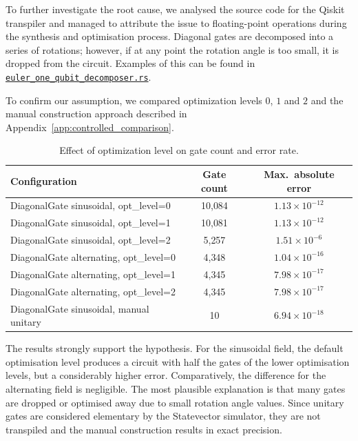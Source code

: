 To further investigate the root cause, we analysed the source code for the Qiskit transpiler and managed to attribute the issue to floating-point operations during the synthesis and optimisation process.
Diagonal gates are decomposed into a series of rotations; however, if at any point the rotation angle is too small, it is dropped from the circuit.
Examples of this can be found in \href{https://github.com/Qiskit/qiskit/blob/main/crates/synthesis/src/euler_one_qubit_decomposer.rs}{\texttt{euler\_one\_qubit\_decomposer.rs}}.

To confirm our assumption, we compared optimization levels $0$, $1$ and $2$ and the manual construction approach described in Appendix~\ref{app:controlled_comparison}.

\begin{table}[H]
\centering
\begin{tabular}{lcc}
\toprule
Configuration & Gate count & Max.\ absolute error \\
\midrule
DiagonalGate sinusoidal, opt\_level=0 & 10{,}084 & $1.13 \times 10^{-12}$ \\
DiagonalGate sinusoidal, opt\_level=1 & 10{,}081 & $1.13 \times 10^{-12}$ \\
DiagonalGate sinusoidal, opt\_level=2 & 5{,}257 & $1.51 \times 10^{-6}$ \\
DiagonalGate alternating, opt\_level=0 & 4{,}348 & $1.04 \times 10^{-16}$ \\
DiagonalGate alternating, opt\_level=1 & 4{,}345 & $7.98 \times 10^{-17}$ \\
DiagonalGate alternating, opt\_level=2 & 4{,}345 & $7.98 \times 10^{-17}$ \\
DiagonalGate sinusoidal, manual unitary & 10 & $6.94 \times 10^{-18}$ \\
\bottomrule
\end{tabular}
\caption{Effect of optimization level on gate count and error rate.}
\label{tab:collision_opt}
\end{table}

The results strongly support the hypothesis.
For the sinusoidal field, the default optimisation level produces a circuit with half the gates of the lower optimisation levels, but a considerably higher error.
Comparatively, the difference for the alternating field is negligible.
The most plausible explanation is that many gates are dropped or optimised away due to small rotation angle values.
Since unitary gates are considered elementary by the Statevector simulator, they are not transpiled and the manual construction results in exact precision.

